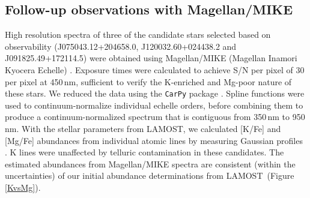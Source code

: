 \documentclass[a4paper,fleqn,usenatbib]{mnras}
\newcommand{\todo}[1]{\textcolor{red}{#1}}
\newcommand{\project}[1]{#1}
\newcommand{\lamost}{\project{LAMOST}}
\begin{document}


\subsection{Follow-up observations with Magellan/MIKE}
High resolution spectra of three of the candidate stars selected based on observability (J075043.12+204658.0, J120032.60+024438.2 and J091825.49+172114.5) were obtained using Magellan/MIKE (Magellan Inamori Kyocera Echelle) \citep{shectman2003magellan,bernstein2003mike}. Exposure times were calculated to achieve S/N per pixel of 30 per pixel at 450\,nm, sufficient to verify the K-enriched and Mg-poor nature of these stars. We reduced the data using the \texttt{CarPy} package \citep{kelson2003}. Spline functions were used to continuum-normalize individual echelle orders, before combining them to produce a continuum-normalized spectrum that is contiguous from 350\,nm to 950\,nm. With the stellar parameters from \lamost, we calculated [K/Fe] and [Mg/Fe] abundances from individual atomic lines by measuring Gaussian profiles \citep{castelli2004,sneden,casey2014}. K lines were unaffected by telluric contamination in these candidates. The estimated abundances from Magellan/MIKE spectra are consistent (within the uncertainties) of our initial abundance determinations from \lamost\ (Figure \ref{KvsMg}).
\end{document}

